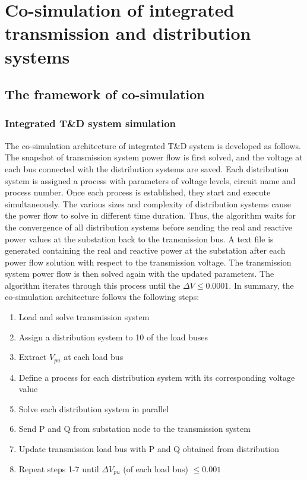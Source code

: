 \documentclass{article}
\begin{document}
\section{Co-simulation of integrated transmission and distribution systems}
\subsection{The framework of co-simulation}
\subsubsection{Integrated T\&D system simulation}
The co-simulation architecture of integrated T\&D system is developed as follows. The snapshot of transmission system power flow is first solved, and the voltage at each bus connected with the distribution systems are saved. Each distribution system is assigned a process with parameters of voltage levels, circuit name and process number. Once each process is established, they start and execute simultaneously. The various sizes and complexity of distribution systems cause the power flow to solve in different time duration. Thus, the algorithm waits for the convergence of all distribution systems before sending the real and reactive power values at the substation back to the transmission bus. A text file is generated containing the real and reactive power at the substation after each power flow solution with respect to the transmission voltage. The transmission system power flow is then solved again with the updated parameters. The algorithm iterates through this process until the $\Delta V \leq 0.0001$. In summary, the co-simulation architecture follows the following steps:\par

\begin{enumerate}[label=S-$\arabic*$.]
    \item Load and solve transmission system
    \item Assign a distribution system to 10 of the load buses
    \item Extract $V_{pu}$ at each load bus
    \item Define a process for each distribution system with its corresponding voltage value
    \item Solve each distribution system in parallel
    \item Send P and Q from substation node to the transmission system
    \item Update transmission load bus with P and Q obtained from distribution
    \item Repeat steps 1-7 until $\Delta V_{pu}$ (of each load bus) $\leq 0.001$\par
\end{enumerate}
\end{document}
